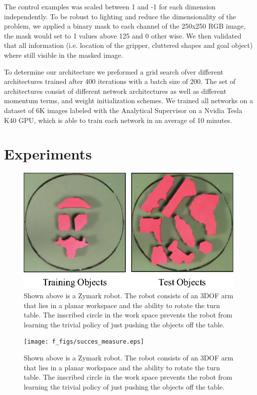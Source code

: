 \documentclass[10pt, conference]{ieeeconf}      %
\begin{document}
The control examples was scaled between 1 and -1 for each dimension independently. To be robust to lighting and reduce the dimensionality of the problem, we applied a binary mask to each channel of the 250x250 RGB image, the mask would set to 1 values above 125 and 0 other wise.  We then validated that all information (i.e. location of the gripper, cluttered shapes and goal object) where still visible in the masked image. 

To determine our architecture we preformed a grid search ofver different architectures  trained after 400 iterations with a batch size of 200. The set of architectures consist of different network architectures as well as different momentum terms, and weight initialization schemes. We trained all networks on a dataset of 6K images labeled with the Analytical Supervisor on a Nvidia Tesla K40 GPU, which is able to train each network in an average of 10 minutes.  


\section{Experiments} \label{sec:Exp}

\begin{figure}[t!]
\centering
\includegraphics[width=\columnwidth]{f_figs/shapes_set.eps}
\caption{ \footnotesize Shown above is a Zymark robot. The robot consists of an 3DOF arm that lies in a planar workspace and the ability to rotate the turn table. The inscribed circle in the work space prevents the robot from learning the trivial policy of just pushing the objects off the table.}
\vspace*{-10pt}
\label{fig:robot}
\end{figure}



\begin{figure}[t!]
\centering
\texttt{[image: f\_figs/succes\_measure.eps]}
\caption{ \footnotesize Shown above is a Zymark robot. The robot consists of an 3DOF arm that lies in a planar workspace and the ability to rotate the turn table. The inscribed circle in the work space prevents the robot from learning the trivial policy of just pushing the objects off the table.}
\vspace*{-10pt}
\label{fig:robot}
\end{figure}
\end{document}
